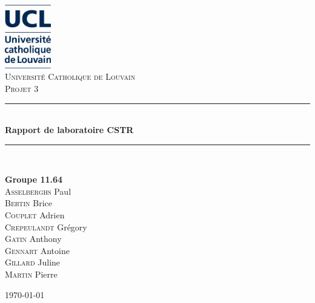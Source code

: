 \documentclass[a4paper,11pt, french]{article}
\begin{document}

\newcommand{\HRule}{\rule{\linewidth}{0.5mm}}

\fancyhf{} %
\fancyhead[R]{\thepage} %


\pagestyle{fancy}
\thispagestyle{empty}
\begin{titlepage}
\begin{center}

\includegraphics[width=0.15\textwidth]{pictures/logo.JPG}~\\[1cm]

\textsc{\LARGE Université Catholique de Louvain}\\[1.5cm]

\textsc{\Large Projet 3}\\[0.5cm]

\HRule \\[0.4cm]
{ \huge \bfseries Rapport de laboratoire CSTR\\[0.4cm] }

\HRule \\[1.5cm]

\begin{minipage}{0.4\textwidth}
\begin{flushleft} \large
\textbf{Groupe \textsc{11.64}} \\
\textsc{Asselberghs} Paul \\
\textsc{Bertin} Brice \\
\textsc{Couplet} Adrien \\
\textsc{Crepeulandt} Grégory \\
\textsc{Gatin} Anthony \\
\textsc{Gennart} Antoine \\
\textsc{Gillard} Juline \\
\textsc{Martin} Pierre


\end{flushleft}
\end{minipage}
\begin{minipage}{0.4\textwidth}
\begin{flushright} \large
\end{flushright}
\end{minipage}

\setcounter{tocdepth}{2}
\tableofcontents %

\vfill

{\large \today}
\end{center}
\end{titlepage}
\end{document}
